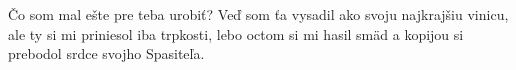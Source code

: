 Čo som mal ešte pre teba urobiť?
Veď som ťa vysadil ako svoju najkrajšiu vinicu,
ale ty si mi priniesol iba trpkosti,
lebo octom si mi hasil smäd
a kopijou si prebodol srdce svojho Spasiteľa.